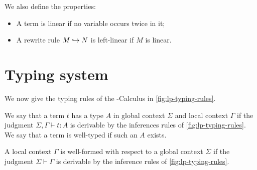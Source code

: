 \begin{definition}[Linearity]
We also define the properties:
\begin{itemize}
\item A term is linear if no variable occurs twice in it;
\item A rewrite rule $M \hookrightarrow N$ is left-linear if $M$ is linear.
\end{itemize}
\end{definition}

\section{Typing system}
\label{sect:lambdapi}

We now give the typing rules of the \lpm{}-Calculus in \cref{fig:lp-typing-rules}.

\begin{definition}
We say that a term $t$ has a type $A$ in global context $\Sigma$ and local context $\Gamma$ if the judgment $\Sigma,\Gamma \vdash t: A$ is
derivable by the inferences rules of \cref{fig:lp-typing-rules}. We say that a term is well-typed if such an $A$ exists.
\end{definition}

\begin{definition}
A local context $\Gamma$ is well-formed with respect to a global context $\Sigma$ if the judgment $\Sigma \vdash \Gamma$ is derivable by the inference rules of \cref{fig:lp-typing-rules}.
\end{definition}


